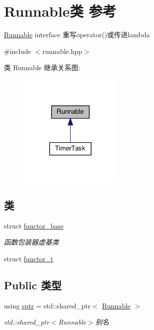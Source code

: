 \hypertarget{classRunnable}{}\section{Runnable类 参考}
\label{classRunnable}


\hyperlink{classRunnable}{Runnable} interface 重写operator()或传进lambda  




{\ttfamily \#include $<$runnable.\+hpp$>$}



类 Runnable 继承关系图\+:\nopagebreak
\begin{figure}[H]
\begin{center}
\leavevmode
\includegraphics[width=143pt]{classRunnable__inherit__graph}
\end{center}
\end{figure}
\subsection*{类}
\begin{DoxyCompactItemize}
\item 
struct \hyperlink{structRunnable_1_1functor__base}{functor\+\_\+base}
\begin{DoxyCompactList}\small\item\em 函数包装器虚基类 \end{DoxyCompactList}\item 
struct \hyperlink{structRunnable_1_1functor__t}{functor\+\_\+t}
\end{DoxyCompactItemize}
\subsection*{Public 类型}
\begin{DoxyCompactItemize}
\item 
\mbox{\label{classRunnable_abe8d3066c7305401d6f0aad8e70780f2}} 
using \hyperlink{classRunnable_abe8d3066c7305401d6f0aad8e70780f2}{sptr} = std\+::shared\+\_\+ptr$<$ \hyperlink{classRunnable}{Runnable} $>$
\begin{DoxyCompactList}\small\item\em std\+::shared\+\_\+ptr$<$\+Runnable$>$别名 \end{DoxyCompactList}\end{DoxyCompactItemize}
